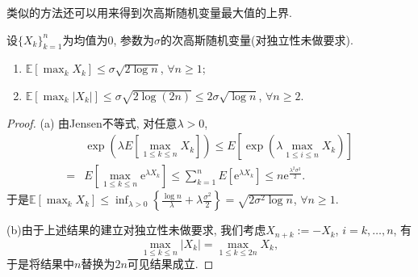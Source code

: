 类似的方法还可以用来得到次高斯随机变量最大值的上界. 
\begin{theorem}[次高斯随机变量最大值的上界]\label{thm:UpperBdForMaximaOfSGRV}
	设$\{X_k\}_{k=1}^n$为均值为$0$, 参数为$\sigma$的次高斯随机变量(对独立性未做要求). 
	\begin{enumerate}[label=(\alph*)]
		\item $\mathbb{E} \left[ \max_k X_k \right] \leq \sigma \sqrt{2 \log n}$, $\forall n \geq 1$; 
		\item $\mathbb{E} \left[ \max_k \left| X_k \right| \right] \leq \sigma \sqrt{2 \log (2n)} \leq 2 \sigma \sqrt{\log n}$, $\forall n \geq 2$. 
	\end{enumerate}
\end{theorem}
\begin{proof}
(a) 由Jensen不等式, 对任意$\lambda > 0$, 
		\begin{align*}
			& \exp \left(\lambda E \left[ \max_{1 \leq k \leq n} X_k \right] \right)
			\leq E \left[ \exp \left( \lambda \max_{1 \leq i \leq n} X_k \right) \right] \\ 
			= & E \left[ \max_{1 \leq k \leq n} \mathrm{e}^{\lambda X_k} \right]
			\leq \sum_{k=1}^n  E \left[ \mathrm{e}^{\lambda X_k} \right]
			\leq n \mathrm{e}^{\frac{\lambda^2 \sigma^2}{2}}. 
		\end{align*}
		于是$\mathbb{E} \left[ \max_k X_k \right] \leq \inf_{\lambda > 0} \left\{ \frac{\log n}{\lambda} + \lambda \frac{\sigma^2}{2} \right\} = \sqrt{2 \sigma^2 \log n}$, $\forall n \geq 1$. 

(b)由于上述结果的建立对独立性未做要求, 我们考虑$X_{n+k} := - X_k$, $i = k, \dots, n$, 有
		\begin{equation*}
			\max_{1 \leq k \leq n} |X_k| = \max_{1 \leq k \leq 2n} X_k, 
		\end{equation*}
		于是将结果中$n$替换为$2n$可见结果成立. 
\end{proof}

